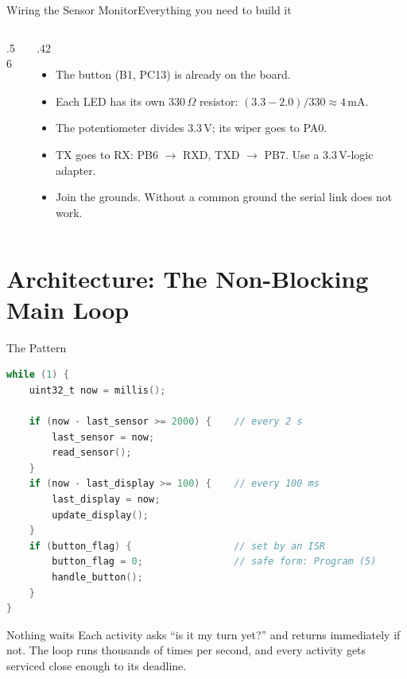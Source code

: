 \documentclass[9pt,aspectratio=169,xcolor=table]{beamer}
\begin{document}
\begin{frame}{Wiring the Sensor Monitor}{Everything you need to build it}
\begin{columns}[c]
\begin{column}{.56\textwidth}
\begin{center}
\begin{circuitikz}[x=1cm, y=1cm, scale=0.8, transform shape, font=\sffamily\scriptsize]
\end{circuitikz}
        \end{center}
    \end{column}
    \begin{column}{.42\textwidth}
        {\small
        \begin{itemize}\itemsep2pt
            \item The button (B1, PC13) is \alert{already on the board}.
            \item Each LED has its own 330\,$\Omega$ resistor: $(3.3-2.0)/330 \approx 4$\,mA.
            \item The potentiometer divides 3.3\,V; its wiper goes to \alert{PA0}.
            \item TX goes to RX: \alert{PB6 $\rightarrow$ RXD}, \alert{TXD $\rightarrow$ PB7}. Use a 3.3\,V-logic adapter.
            \item \alert{Join the grounds.} Without a common ground the serial link does not work.
        \end{itemize}}
    \end{column}
    \end{columns}
\end{frame}

\section{Architecture: The Non-Blocking Main Loop}

\begin{frame}[fragile]{The Pattern}
\begin{lstlisting}[language=C, basicstyle=\ttfamily\scriptsize]
while (1) {
    uint32_t now = millis();

    if (now - last_sensor >= 2000) {    // every 2 s
        last_sensor = now;
        read_sensor();
    }
    if (now - last_display >= 100) {    // every 100 ms
        last_display = now;
        update_display();
    }
    if (button_flag) {                  // set by an ISR
        button_flag = 0;                // safe form: Program (5)
        handle_button();
    }
}
\end{lstlisting}

    \vspace{2mm}
    \begin{block}{Nothing waits}
        Each activity asks ``is it my turn yet?'' and returns immediately if not.
        The loop runs thousands of times per second, and every activity gets
        serviced \alert{close enough} to its deadline.
    \end{block}
\end{frame}
\end{document}
